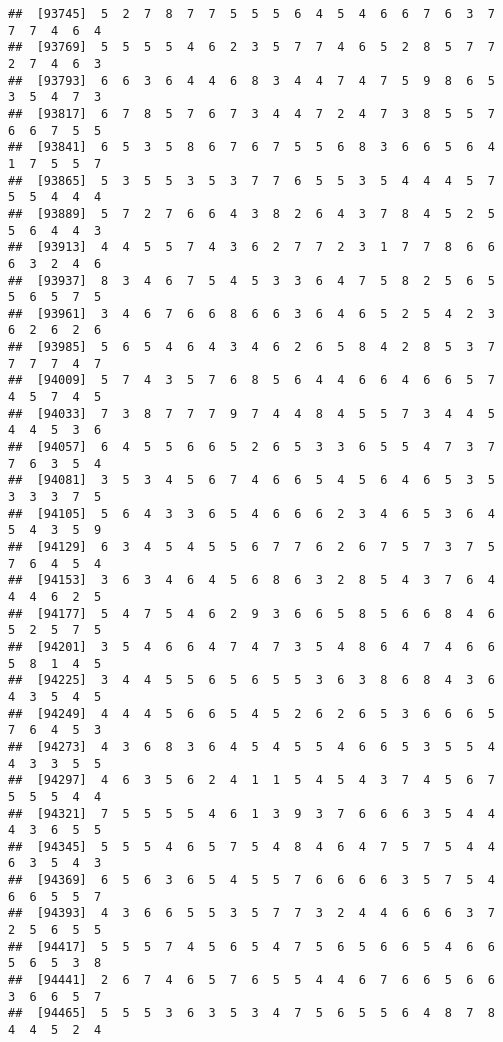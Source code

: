 \documentclass[
]{book}
\begin{document}
\begin{verbatim}
##  [93745]  5  2  7  8  7  7  5  5  5  6  4  5  4  6  6  7  6  3  7  7  7  4  6  4
##  [93769]  5  5  5  5  4  6  2  3  5  7  7  4  6  5  2  8  5  7  7  2  7  4  6  3
##  [93793]  6  6  3  6  4  4  6  8  3  4  4  7  4  7  5  9  8  6  5  3  5  4  7  3
##  [93817]  6  7  8  5  7  6  7  3  4  4  7  2  4  7  3  8  5  5  7  6  6  7  5  5
##  [93841]  6  5  3  5  8  6  7  6  7  5  5  6  8  3  6  6  5  6  4  1  7  5  5  7
##  [93865]  5  3  5  5  3  5  3  7  7  6  5  5  3  5  4  4  4  5  7  5  5  4  4  4
##  [93889]  5  7  2  7  6  6  4  3  8  2  6  4  3  7  8  4  5  2  5  5  6  4  4  3
##  [93913]  4  4  5  5  7  4  3  6  2  7  7  2  3  1  7  7  8  6  6  6  3  2  4  6
##  [93937]  8  3  4  6  7  5  4  5  3  3  6  4  7  5  8  2  5  6  5  5  6  5  7  5
##  [93961]  3  4  6  7  6  6  8  6  6  3  6  4  6  5  2  5  4  2  3  6  2  6  2  6
##  [93985]  5  6  5  4  6  4  3  4  6  2  6  5  8  4  2  8  5  3  7  7  7  7  4  7
##  [94009]  5  7  4  3  5  7  6  8  5  6  4  4  6  6  4  6  6  5  7  4  5  7  4  5
##  [94033]  7  3  8  7  7  7  9  7  4  4  8  4  5  5  7  3  4  4  5  4  4  5  3  6
##  [94057]  6  4  5  5  6  6  5  2  6  5  3  3  6  5  5  4  7  3  7  7  6  3  5  4
##  [94081]  3  5  3  4  5  6  7  4  6  6  5  4  5  6  4  6  5  3  5  3  3  3  7  5
##  [94105]  5  6  4  3  3  6  5  4  6  6  6  2  3  4  6  5  3  6  4  5  4  3  5  9
##  [94129]  6  3  4  5  4  5  5  6  7  7  6  2  6  7  5  7  3  7  5  7  6  4  5  4
##  [94153]  3  6  3  4  6  4  5  6  8  6  3  2  8  5  4  3  7  6  4  4  4  6  2  5
##  [94177]  5  4  7  5  4  6  2  9  3  6  6  5  8  5  6  6  8  4  6  5  2  5  7  5
##  [94201]  3  5  4  6  6  4  7  4  7  3  5  4  8  6  4  7  4  6  6  5  8  1  4  5
##  [94225]  3  4  4  5  5  6  5  6  5  5  3  6  3  8  6  8  4  3  6  4  3  5  4  5
##  [94249]  4  4  4  5  6  6  5  4  5  2  6  2  6  5  3  6  6  6  5  7  6  4  5  3
##  [94273]  4  3  6  8  3  6  4  5  4  5  5  4  6  6  5  3  5  5  4  4  3  3  5  5
##  [94297]  4  6  3  5  6  2  4  1  1  5  4  5  4  3  7  4  5  6  7  5  5  5  4  4
##  [94321]  7  5  5  5  5  4  6  1  3  9  3  7  6  6  6  3  5  4  4  4  3  6  5  5
##  [94345]  5  5  5  4  6  5  7  5  4  8  4  6  4  7  5  7  5  4  4  6  3  5  4  3
##  [94369]  6  5  6  3  6  5  4  5  5  7  6  6  6  6  3  5  7  5  4  6  6  5  5  7
##  [94393]  4  3  6  6  5  5  3  5  7  7  3  2  4  4  6  6  6  3  7  2  5  6  5  5
##  [94417]  5  5  5  7  4  5  6  5  4  7  5  6  5  6  6  5  4  6  6  5  6  5  3  8
##  [94441]  2  6  7  4  6  5  7  6  5  5  4  4  6  7  6  6  5  6  6  3  6  6  5  7
##  [94465]  5  5  5  3  6  3  5  3  4  7  5  6  5  5  6  4  8  7  8  4  4  5  2  4

\end{verbatim}
\end{document}

